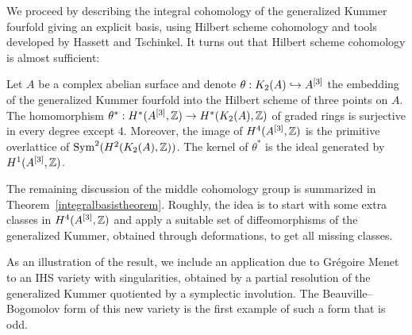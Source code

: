 We proceed by describing the integral cohomology of the generalized Kummer fourfold giving an explicit basis, using Hilbert scheme cohomology and tools developed by Hassett and Tschinkel. It turns out that Hilbert scheme cohomology is almost sufficient:
{
\renewcommand{\thetheorem}{\ref{thetaTheorem}(i)}
\begin{theorem}
Let $A$ be a complex abelian surface and denote $\theta: \kum{A}{2}\hookrightarrow A^{[3]}$ the embedding of the generalized Kummer fourfold into the Hilbert scheme of three points on $A$.
The homomorphism $\theta^*:H^*(A\hilb{3},\Z)\rightarrow H^*(\kum{A}{2},\Z)$ of graded rings is surjective in every degree except $4$. Moreover, the image of $H^4(A\hilb{3},\Z)$ is the primitive overlattice of $\Sym^2(H^2(\kum{A}{2},\Z))$. 
The kernel of $\theta^*$ is the ideal generated by $H^1(A\hilb{3},\Z)$.
\end{theorem}
\addtocounter{theorem}{-1}
}
The remaining discussion of the middle cohomology group is summarized in Theorem~\ref{integralbasistheorem}. Roughly, the idea is to start with some extra classes in $H^4(A\hilb{3},\Z)$ and apply a suitable set of diffeomorphisms of the generalized Kummer, obtained through deformations, to get all missing classes.

As an illustration of the result, we include an application due to Gr\'egoire Menet to an IHS variety with singularities, obtained by a partial resolution of the generalized Kummer quotiented by a symplectic involution. The Beauville--Bogomolov form of this new variety is the first example of such a form that is odd.

